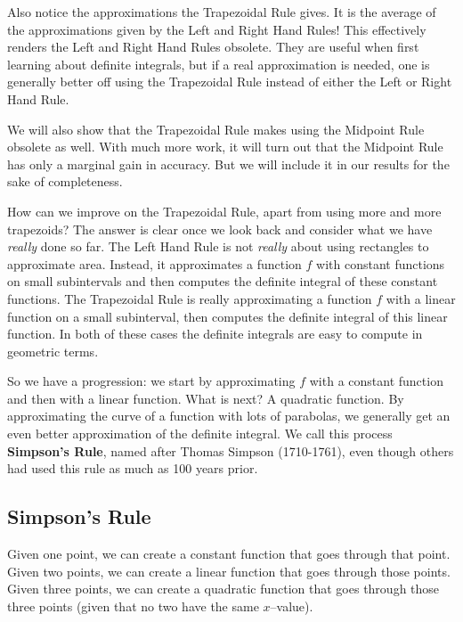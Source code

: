 Also notice the  approximations the Trapezoidal Rule gives. It is  the average of the approximations given by the Left and Right Hand Rules! This effectively renders the Left and Right Hand Rules obsolete. They are useful when first learning about definite integrals, but if a real approximation is needed, one is generally better off using the Trapezoidal Rule instead of either the Left or Right Hand Rule.

We will also show that the Trapezoidal Rule makes using the Midpoint Rule obsolete as well.  With much more work, it will turn out that the Midpoint Rule has only a marginal gain in accuracy.  But we will include it in our results for the sake of completeness.\bigskip

How can we improve on the Trapezoidal Rule, apart from using more and more trapezoids? The answer is clear once we look back and consider what we have \textit{really} done so far. The Left Hand Rule is not \textit{really} about using rectangles to approximate area. Instead, it approximates a function $f$ with constant functions on small subintervals and then computes the definite integral of these constant functions. The Trapezoidal Rule is really approximating a function $f$ with a linear function on a small subinterval, then computes the definite integral of this linear function. In both of these cases the definite integrals are easy to compute in geometric terms.

So we have a progression: we start by approximating $f$ with a constant function and then with a linear function. What is next? A quadratic function. By approximating the curve of a function with lots of parabolas, we generally get an even better approximation of the definite integral. We call this process \textbf{Simpson's Rule}, named after Thomas Simpson (1710-1761), even though others had used this rule as much as 100 years prior.

\subsection{Simpson's Rule}

Given one point, we can create a constant function that goes through that point. Given two points, we can create a linear function that goes through those points. Given three points, we can create a quadratic function that goes through those three points (given that no two have the same $x$--value).


